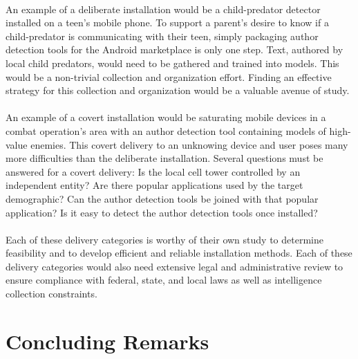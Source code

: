 			\paragraph*{}An example of a deliberate installation would be a child-predator detector installed on a teen's mobile phone. To support a parent's desire to know if a child-predator is communicating with their teen, simply packaging author detection tools for the Android marketplace is only one step.  Text, authored by local child predators, would need to be gathered and trained into models.  This would be a non-trivial collection and organization effort. Finding an effective strategy for this collection and organization would be a valuable avenue of study.
			\paragraph*{} An example of a covert installation would be saturating mobile devices in a combat operation's area with an author detection tool containing models of high-value enemies. This covert delivery to an unknowing device and user poses many more difficulties than the deliberate installation. Several questions must be answered for a covert delivery:  Is the local cell tower controlled by an independent entity?  Are there popular applications used by the target demographic?  Can the author detection tools be joined with that popular application?  Is it easy to detect the author detection tools once installed?
			\paragraph*{} Each of these delivery categories is worthy of their own study to determine feasibility and to develop efficient and reliable installation methods.  Each of these delivery categories would also need extensive legal and administrative review to ensure compliance with federal, state, and local laws as well as intelligence collection constraints.






  












\section{Concluding Remarks}
